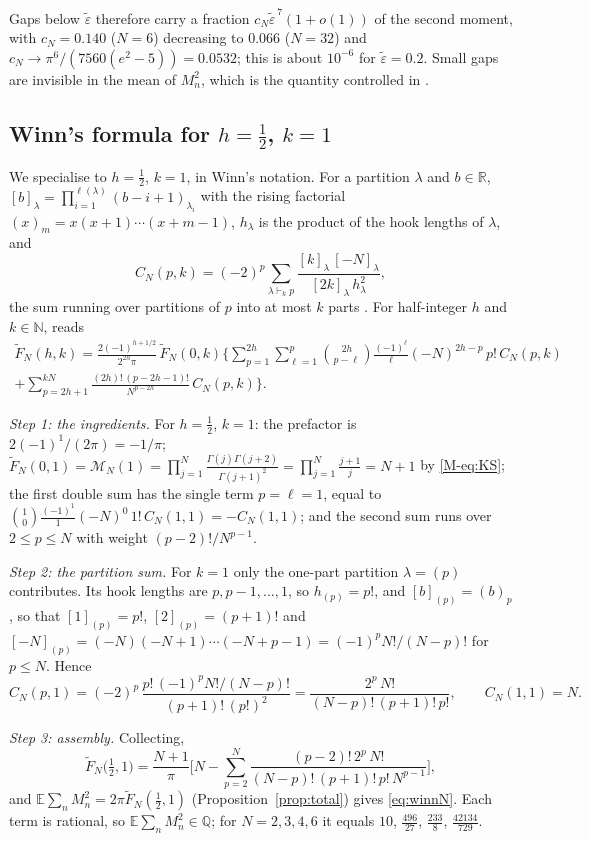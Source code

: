 \documentclass[12pt]{amsart}
\theoremstyle{remark}
\newcommand{\E}{\mathbb{E}}
\newcommand{\eps}{\varepsilon}
\newcommand{\1}{\mathbf{1}}
\begin{document}
Gaps below $\tilde\eps$ therefore carry a fraction
$c_N\tilde\eps^{\,7}(1+o(1))$ of the second moment, with $c_N=0.140$
($N=6$) decreasing to $0.066$ ($N=32$) and
$c_N\to\pi^6/(7560(e^2-5))=0.0532$; this is about $10^{-6}$ for
$\tilde\eps=0.2$. Small gaps are invisible in the mean of $M_n^2$, which is
the quantity controlled in \cite{CG85,HLPC24}.

\subsection*{Winn's formula for $h=\frac12$, $k=1$}\label{sec:winn}
We specialise \cite[Thm.~2.2, eq.~(2.9)]{Win12} to $h=\frac12$, $k=1$, in
Winn's notation. For a partition $\lambda$ and $b\in\mathbb R$,
$[b]_\lambda=\prod_{i=1}^{\ell(\lambda)}(b-i+1)_{\lambda_i}$ with the rising
factorial $(x)_m=x(x+1)\cdots(x+m-1)$, $h_\lambda$ is the product of the
hook lengths of $\lambda$, and
\[
C_N(p,k)=(-2)^p\sum_{\lambda\vdash_kp}\frac{[k]_\lambda\,[-N]_\lambda}
{[2k]_\lambda\,h_\lambda^2},
\]
the sum running over partitions of $p$ into at most $k$ parts
\cite[(2.1)--(2.5)]{Win12}. For half-integer $h$ and $k\in\mathbb N$,
\cite[(2.9)]{Win12} reads
\begin{multline*}
\widetilde F_N(h,k)=\frac{2(-1)^{h+1/2}}{2^{2h}\pi}\,\widetilde F_N(0,k)
\Bigg\{\sum_{p=1}^{2h}\sum_{\ell=1}^p\binom{2h}{p-\ell}\frac{(-1)^\ell}{\ell}
(-N)^{2h-p}\,p!\,C_N(p,k)\\
+\sum_{p=2h+1}^{kN}\frac{(2h)!\,(p-2h-1)!}{N^{p-2h}}\,C_N(p,k)\Bigg\}.
\end{multline*}

\emph{Step 1: the ingredients.} For $h=\frac12$, $k=1$: the prefactor is
$2(-1)^1/(2\pi)=-1/\pi$; $\widetilde F_N(0,1)=\mathcal M_N(1)=\prod_{j=1}^N
\frac{\Gamma(j)\Gamma(j+2)}{\Gamma(j+1)^2}=\prod_{j=1}^N\frac{j+1}j=N+1$ by
\eqref{M-eq:KS}; the first double sum has the single term $p=\ell=1$, equal
to $\binom10\frac{(-1)^1}1(-N)^0\,1!\,C_N(1,1)=-C_N(1,1)$; and the second
sum runs over $2\le p\le N$ with weight $(p-2)!/N^{p-1}$.

\emph{Step 2: the partition sum.} For $k=1$ only the one-part partition
$\lambda=(p)$ contributes. Its hook lengths are $p,p-1,\dots,1$, so
$h_{(p)}=p!$, and $[b]_{(p)}=(b)_p$, so that $[1]_{(p)}=p!$,
$[2]_{(p)}=(p+1)!$ and $[-N]_{(p)}=(-N)(-N+1)\cdots(-N+p-1)=(-1)^pN!/(N-p)!$
for $p\le N$. Hence
\[
C_N(p,1)=(-2)^p\,\frac{p!\,(-1)^pN!/(N-p)!}{(p+1)!\,(p!)^2}
=\frac{2^p\,N!}{(N-p)!\,(p+1)!\,p!},\qquad C_N(1,1)=N .
\]

\emph{Step 3: assembly.} Collecting,
\[
\widetilde F_N\big(\tfrac12,1\big)=\frac{N+1}\pi\Big[N-\sum_{p=2}^N
\frac{(p-2)!\,2^p\,N!}{(N-p)!\,(p+1)!\,p!\,N^{p-1}}\Big],
\]
and $\E\sum_nM_n^2=2\pi\widetilde F_N(\frac12,1)$ (Proposition~\ref{prop:total})
gives \eqref{eq:winnN}. Each term is rational, so $\E\sum_nM_n^2\in\mathbb Q$;
for $N=2,3,4,6$ it equals $10$, $\frac{496}{27}$, $\frac{233}8$,
$\frac{42134}{729}$.
\end{document}
